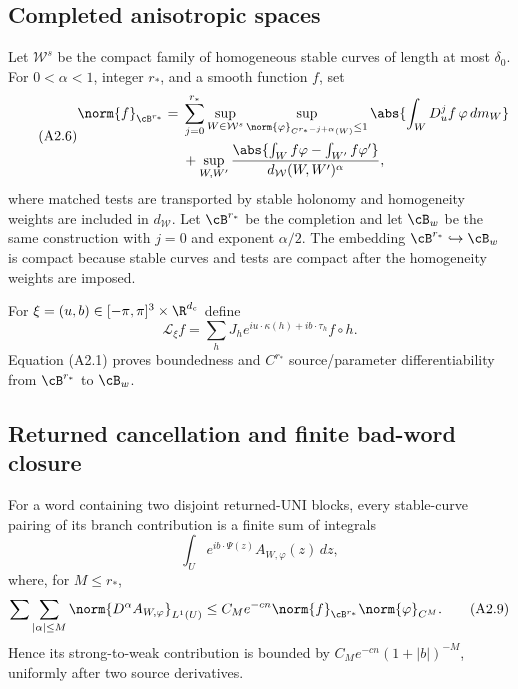 \subsection{Completed anisotropic spaces}

Let $\mathcal W^s$ be the compact family of homogeneous stable curves of
length at most $\delta_0$.  For $0<\alpha<1$, integer $r_*$, and a smooth
function $f$, set
\begin{equation}\tag{A2.6}
\begin{split}
 \norm{f}_{\cB^{r_*}}={}&
 \sum_{j=0}^{r_*}\sup_{W\in\mathcal W^s}
 \sup_{\norm{\varphi}_{C^{r_*-j+\alpha}(W)}\le1}
 \abs{\int_WD_u^jf\,\varphi\,dm_W}\\
 &+\sup_{W,W'}{\abs{\int_Wf\varphi-\int_{W'}f\varphi' }
             \over d_{\mathcal W}(W,W')^\alpha},          
\end{split}
\end{equation}
where matched tests are transported by stable holonomy and homogeneity
weights are included in $d_{\mathcal W}$.  Let $\cB^{r_*}$ be the completion
and let $\cB_w$ be the same construction with $j=0$ and exponent $\alpha/2$.
The embedding $\cB^{r_*}\hookrightarrow\cB_w$ is compact because stable
curves and tests are compact after the homogeneity weights are imposed.

For $\xi=(u,b)\in[-\pi,\pi]^3\times\R^{d_c}$ define
\[
 \mathcal L_\xi f
 =\sum_hJ_h e^{iu\cdot\kappa(h)+ib\cdot\tau_h}f\circ h.   \tag{A2.7}
\]
Equation (A2.1) proves boundedness and $C^{r_*}$ source/parameter
differentiability from $\cB^{r_*}$ to $\cB_w$.

\subsection{Returned cancellation and finite bad-word closure}

\begin{lemma}
\label{lem:r29-a2-uni}
For a word containing two disjoint returned-UNI blocks, every stable-curve
pairing of its branch contribution is a finite sum of integrals
\[
 \int_Ue^{ib\cdot\Psi(z)}A_{W,\varphi}(z)\,dz,             \tag{A2.8}
\]
where, for $M\le r_*$,
\[
 \sum\sum_{|\alpha|\le M}
\norm{D^\alpha A_{W,\varphi}}_{L^1(U)}
 \le C_Me^{-c n}\norm{f}_{\cB^{r_*}}
\norm{\varphi}_{C^M}. \tag{A2.9}
\]
Hence its strong-to-weak contribution is bounded by
$C_Me^{-cn}(1+|b|)^{-M}$, uniformly after two source derivatives.
\end{lemma}

